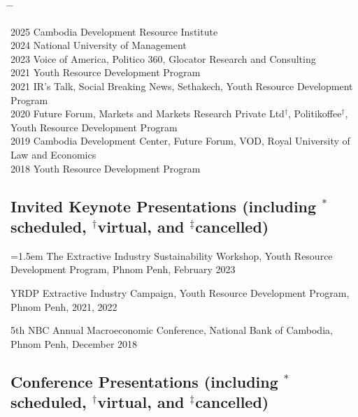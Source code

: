 \documentclass[10pt,a4paper]{article}
\newcommand{\tabbedblock}[1]{

	\begin{tabbing}
		\hspace{2cm} \= \hspace{4cm} \= \kill
		#1
	\end{tabbing}
}
\begin{document}
\tabbedblock{
	2025 \> Cambodia Development Resource Institute\\ 
	
	2024 \> National University of Management\\ 
	
	2023 \> Voice of America, Politico 360, Glocator Research and Consulting \\
		
	2021  \>  Youth Resource Development Program \\
	
	
	2021  \>  IR’s Talk, Social Breaking News, Sethakech, Youth Resource Development Program \\
	
	2020 \>  Future Forum, Markets and Markets Research Private Ltd$^\dag$, Politikoffee$^\dag$, \\
	\> Youth Resource Development Program \\
	
	2019 \> Cambodia Development Center, Future Forum, VOD, Royal University of Law and Economics \\
	
	2018 \> Youth Resource Development Program
}
	
	
\subsection*{Invited Keynote Presentations (including $^\ast$scheduled, $^\dag$virtual, and $^\ddag$cancelled)}

\hangindent=1.5em
The Extractive Industry Sustainability Workshop, Youth Resource Development Program, Phnom Penh, February 2023

YRDP Extractive Industry Campaign, Youth Resource Development Program, Phnom Penh, 2021, 2022

5th NBC Annual Macroeconomic Conference, National Bank of Cambodia, Phnom Penh, December 2018


\subsection*{Conference Presentations (including $^\ast$scheduled, $^\dag$virtual, and $^\ddag$cancelled)}
\end{document}
